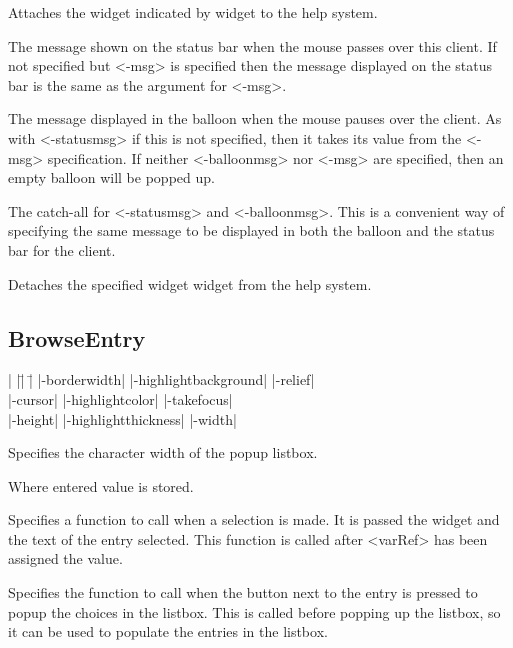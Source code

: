 \begin{enum}{1cm}

Attaches the widget indicated by widget to the help system.

The message shown on the status bar when the mouse passes over this client. If not specified
but <-msg> is specified then the message displayed on the status bar is the same as the argument for <-msg>. 

The message displayed in the balloon when the mouse pauses over the client. As with <-statusmsg>
if this is not specified, then it takes its value from the <-msg> specification. If neither
<-balloonmsg> nor <-msg> are specified, then an empty balloon will be popped up.

The catch-all for <-statusmsg> and <-balloonmsg>. This is a convenient way of specifying
the same message to be displayed in both the balloon and the status bar for the client. 

Detaches the specified widget widget from the help system. 

\end{enum}

\subsection*{BrowseEntry}
\vspace{-4pt}

\begin{tabbing}
|                   |\=|                     |\= \kill
|-borderwidth|      \> |-highlightbackground| \> |-relief| \\
|-cursor|           \> |-highlightcolor|      \> |-takefocus| \\
|-height|	    \> |-highlightthickness|  \> |-width| \\
\end{tabbing}

\vskip5pt

\begin{enum}{1cm}

Specifies the character width of the popup listbox. 

Where entered value is stored. 

Specifies a function to call when a selection is made.
It is passed the widget and the text of the entry
selected. This function is called after <varRef> has been
assigned the value.

Specifies the function to call when the button next to the entry is pressed to popup the
choices in the listbox. This is called before popping up the listbox, so it can be used to
populate the entries in the listbox. 

\end{enum}

